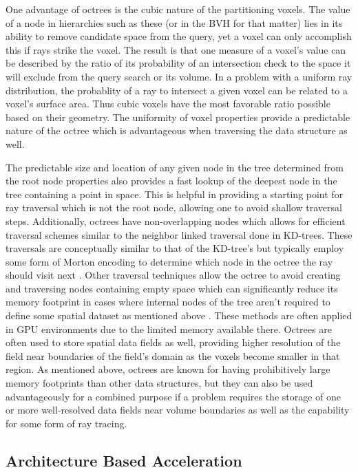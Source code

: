 \documentclass[12pt, a4paper]{article}
\begin{document}
One advantage of octrees is the cubic nature of the partitioning voxels. The value of a node in hierarchies such as these (or in the BVH for that matter) lies in its ability to remove candidate space from the query, yet a voxel can only accomplish this if rays strike the voxel. The result is that one measure of a voxel's value can be described by the ratio of its probability of an intersection check to the space it will exclude from the query search or its volume. In a problem with a uniform ray distribution, the probablity of a ray to intersect a given voxel can be related to a voxel's surface area. Thus cubic voxels have the most favorable ratio possible based on their geometry. The uniformity of voxel properties provide a predictable nature of the octree which is advantageous when traversing the data structure as well. 

The predictable size and location of any given node in the tree determined from the root node properties also provides a fast lookup of the deepest node in the tree containing a point in space. This is helpful in providing a starting point for ray traversal which is not the root node, allowing one to avoid shallow traversal steps. Additionally, octrees have non-overlapping nodes which allows for efficient traversal schemes similar to the neighbor linked traversal done in KD-trees. These traversals are conceptually similar to that of the KD-tree's but typically employ some form of Morton encoding to determine which node in the octree the ray should visit next \cite{Revelles_2000}. Other traversal techniques allow the octree to avoid creating and traversing nodes containing empty space which can significantly reduce its memory footprint in cases where internal nodes of the tree aren't required to define some spatial dataset as mentioned above \cite{Samet_1989}. These methods are often applied in GPU environments due to the limited memory available there. Octrees are often used to store spatial data fields as well, providing higher resolution of the field near boundaries of the field's domain as the voxels become smaller in that region. As mentioned above, octrees are known for having prohibitively large memory footprints than other data structures, but they can also be used advantageously for a combined purpose if a problem requires the storage of one or more well-resolved data fields near volume boundaries as well as the capability for some form of ray tracing.


\subsection{Architecture Based Acceleration}%
\label{subsec:arch}
\end{document}
